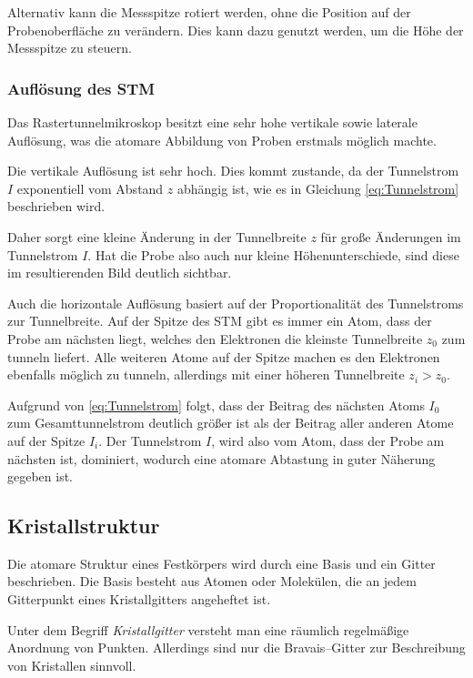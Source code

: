 \documentclass[12pt,a4paper]{scrartcl}
\numberwithin{equation}{section} %
\begin{document}
Alternativ kann die Messspitze rotiert werden, ohne die Position auf der Probenoberfläche zu verändern. Dies kann dazu genutzt werden, um die Höhe der Messspitze zu steuern.

\hypertarget{auflösung}{
\subsubsection{Auflösung des STM}\label{auflösung}}
Das Rastertunnelmikroskop besitzt eine sehr hohe vertikale sowie laterale Auflösung, was die atomare Abbildung von Proben erstmals möglich machte.

Die vertikale Auflösung ist sehr hoch. Dies kommt zustande, da der Tunnelstrom $I$ exponentiell vom Abstand $z$ abhängig ist, wie es in Gleichung \eqref{eq:Tunnelstrom} beschrieben wird.

Daher sorgt eine kleine Änderung in der Tunnelbreite $z$ für große Änderungen im Tunnelstrom $I$. Hat die Probe also auch nur kleine Höhenunterschiede, sind diese im resultierenden Bild deutlich sichtbar.

Auch die horizontale Auflösung basiert auf der Proportionalität des Tunnelstroms zur Tunnelbreite. Auf der Spitze des STM gibt es immer ein Atom, dass der Probe am nächsten liegt, welches den Elektronen die kleinste Tunnelbreite $z_0$ zum tunneln liefert. Alle weiteren Atome auf der Spitze machen es den Elektronen ebenfalls möglich zu tunneln, allerdings mit einer höheren Tunnelbreite $z_i > z_0$.

Aufgrund von \eqref{eq:Tunnelstrom} folgt, dass der Beitrag des nächsten Atoms $I_0$ zum Gesamttunnelstrom deutlich größer ist als der Beitrag aller anderen Atome auf der Spitze $I_i$. Der Tunnelstrom $I$, wird also vom Atom, dass der Probe am nächsten ist, dominiert, wodurch eine atomare Abtastung in guter Näherung gegeben ist.

\hypertarget{kristallstruktur}{%
\subsection{Kristallstruktur}\label{kristallstruktur}}
Die atomare Struktur eines Festkörpers wird durch eine Basis und ein Gitter beschrieben. Die Basis besteht aus Atomen oder Molekülen, die an jedem Gitterpunkt eines Kristallgitters angeheftet ist.

Unter dem Begriff \textit{Kristallgitter} versteht man eine räumlich regelmäßige Anordnung von Punkten. Allerdings sind nur die Bravais--Gitter zur Beschreibung von Kristallen sinnvoll.
\end{document}

